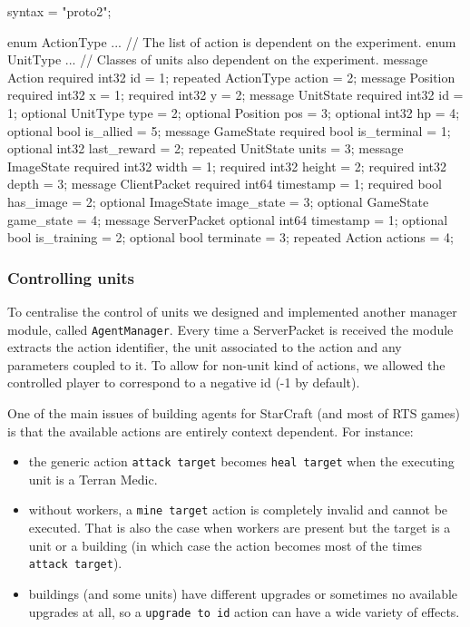 \begin{mehlisting}[caption=Protobuffer schema used to generate the interface used
  to serialise and de-serialise StarCrat's game state., label=ls:proto] 
syntax = "proto2";

enum ActionType {
  ... // The list of action is dependent on the experiment. 
}
enum UnitType {
  ... // Classes of units also dependent on the experiment.
}
message Action {
  required int32 id = 1;
  repeated ActionType action = 2;
}
message Position {
  required int32 x = 1;
  required int32 y = 2;
}
message UnitState {
  required int32 id = 1;
  optional UnitType type = 2;
  optional Position pos = 3;
  optional int32 hp = 4;
  optional bool is_allied = 5;
}
message GameState {
  required bool is_terminal = 1;
  optional int32 last_reward = 2;
  repeated UnitState units = 3;
}
message ImageState {
  required int32 width = 1;
  required int32 height = 2;
  required int32 depth = 3;
}
message ClientPacket {
  required int64 timestamp = 1;
  required bool has_image = 2;
  optional ImageState image_state = 3;
  optional GameState game_state = 4;
}
message ServerPacket {
  optional int64 timestamp = 1;
  optional bool is_training = 2;
  optional bool terminate = 3;
  repeated Action actions = 4; 
}
\end{mehlisting}

\subsubsection{Controlling units}

To centralise the control of units we designed and implemented another manager
module, called \texttt{AgentManager}. Every time a ServerPacket is received the
module extracts the action identifier, the unit associated to the action and any
parameters coupled to it. To allow for non-unit kind of actions, we allowed the
controlled player to correspond to a negative id (-1 by default).

One of the main issues of building agents for StarCraft (and most of RTS games)
is that the available actions are entirely context dependent. 
For instance:

\begin{itemize}
\item the generic action \texttt{attack target} becomes \texttt{heal target}
  when the executing unit is a Terran Medic.
\item without workers, a \texttt{mine target} action is completely invalid and
  cannot be executed. That is also the case when workers are present but the
  target is a unit or a building (in which case the action becomes most of the
  times \texttt{attack target}).
\item buildings (and some units) have different upgrades or sometimes no
  available upgrades at all, so a \texttt{upgrade to id} action can have a wide
  variety of effects.
\end{itemize} 

